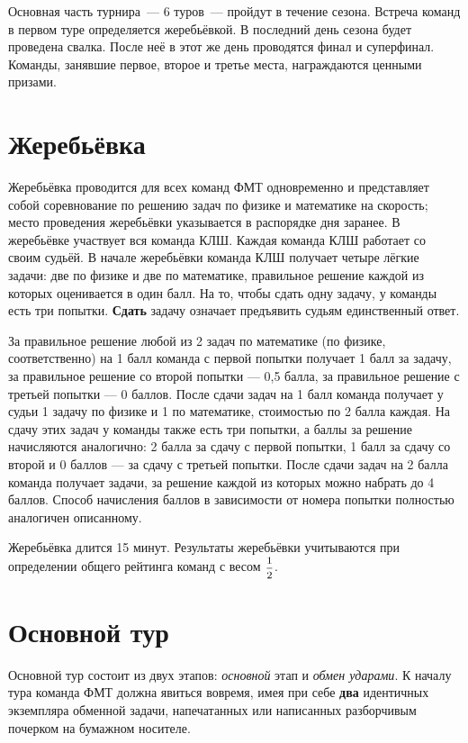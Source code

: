 \documentclass[12pt,a4paper]{article}
\begin{document}
Основная часть турнира~--- 6 туров~--- пройдут в течение сезона. Встреча команд в первом туре определяется жеребьёвкой. В последний день сезона будет проведена свалка. После неё в этот же день проводятся финал и суперфинал. Команды, занявшие первое, второе и третье места, награждаются ценными призами.

\section{Жеребьёвка}
Жеребьёвка проводится для всех команд ФМТ одновременно и представляет собой соревнование по решению задач по физике и математике на скорость; место проведения жеребьёвки указывается в распорядке дня заранее. В жеребьёвке участвует вся команда КЛШ. Каждая команда КЛШ работает со своим судьёй. В начале жеребьёвки команда КЛШ получает четыре лёгкие задачи: две по физике и две по математике, правильное решение каждой из которых оценивается в один балл. На то, чтобы сдать одну задачу, у команды есть три попытки. \textbf{Сдать} задачу означает предъявить судьям единственный ответ.

За правильное решение любой из 2 задач по математике (по физике, соответственно) на 1 балл команда с первой попытки получает 1 балл за задачу, за правильное решение со второй попытки --- 0,5 балла, за правильное решение с третьей попытки --- 0 баллов. После сдачи задач на 1 балл команда получает у судьи 1 задачу по физике и 1 по математике, стоимостью по 2 балла каждая. 
На сдачу этих задач у команды также есть три попытки, а баллы за решение начисляются аналогично: 2 балла за сдачу с первой попытки, 1 балл за сдачу со второй и 0 баллов --- за сдачу с третьей попытки. 
После сдачи задач на 2 балла команда получает задачи, за решение каждой из которых можно набрать до 4 баллов. 
Способ начисления баллов в зависимости от номера попытки полностью аналогичен описанному.

Жеребьёвка длится 15 минут. Результаты жеребьёвки учитываются при определении общего рейтинга команд с весом $\mfrac{1}{2}$.

\section{Основной тур}
Основной тур состоит из двух этапов: \textsl{основной} этап и \textsl{обмен ударами}. К началу тура команда ФМТ должна явиться вовремя, имея при себе {\bf два} идентичных экземпляра обменной задачи, напечатанных или написанных разборчивым почерком на бумажном носителе.
\end{document}
